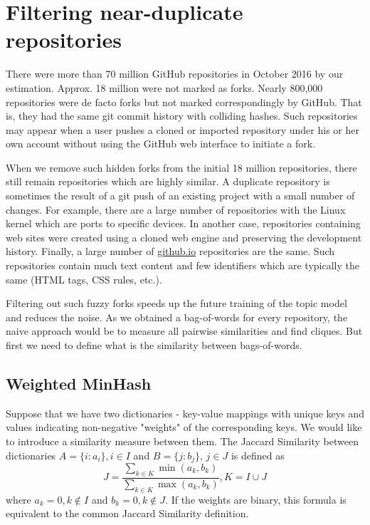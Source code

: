 \documentclass[conference,10pt]{IEEEtran}
\begin{document}
\section{Filtering near-duplicate repositories} \label{fuzzy_clones}
There were more than 70 million GitHub repositories in October 2016 by our estimation. Approx. 18 million were not marked as forks. Nearly 800,000 repositories were de facto forks but not marked correspondingly by GitHub. That is, they had the same git commit history with colliding hashes. Such repositories may appear when a user pushes a cloned or imported repository under his or her own account without using the GitHub web interface to initiate a fork.

When we remove such hidden forks from the initial 18 million repositories, there still remain repositories which are highly similar. A duplicate repository is sometimes the result of a git push of an existing project with a small number of changes. For example, there are a large number of repositories with the Linux kernel which are ports to specific devices. In another case, repositories containing web sites were created using a cloned web engine and preserving the development history. Finally, a large number of \href{https://pages.github.com/}{github.io} repositories are the same. Such repositories contain much text content and few identifiers which are typically the same (HTML tags, CSS rules, etc.).

Filtering out such fuzzy forks speeds up the future training of the topic model and reduces the noise. As we obtained a bag-of-words for every repository, the naive approach would be to measure all pairwise similarities and find cliques. But first we need to define what is the similarity between bags-of-words.

\subsection{Weighted MinHash}
Suppose that we have two dictionaries - key-value mappings with unique keys and values indicating non-negative "weights" of the corresponding keys. We would like to introduce a similarity measure between them. The Jaccard Similarity between dictionaries $A=\{i: a_i\}, i\in I$ and $B=\{j: b_j\}$, $j\in J$ is defined as
\begin{equation}
J=\frac{\sum_ {k\in K}\limits \min(a_k, b_k)}{\sum_ {k\in K}\limits \max(a_k, b_k)}, K=I\cup J
\end{equation}
where $a_k = 0, k\notin I$ and $b_k = 0, k\notin J$. If the weights are
binary, this formula is equivalent to the common Jaccard Similarity definition.
\end{document}
